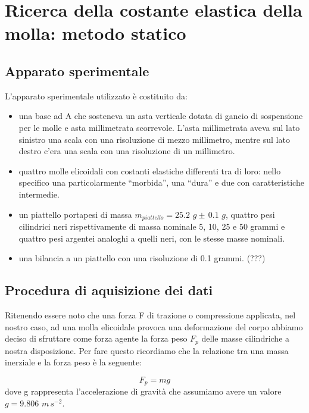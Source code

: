 \section{Ricerca della costante elastica della molla: metodo statico}

\subsection{Apparato sperimentale}
L'apparato sperimentale utilizzato è costituito da:
	\begin{itemize}
		\item{una base ad A che sosteneva un asta verticale dotata di gancio di sospensione per le molle e asta millimetrata scorrevole. L'asta millimetrata aveva sul lato sinistro una scala con una risoluzione di mezzo millimetro, mentre sul lato destro c'era una scala con una risoluzione di un millimetro.}
		\item{quattro molle elicoidali con costanti elastiche differenti tra di loro: nello specifico una particolarmente ``morbida'', una ``dura'' e due con caratteristiche intermedie.}
		\item{un piattello portapesi di massa $m_{piattello} = 25.2\,\,g \pm\, 0.1\,\,g$, quattro pesi cilindrici neri rispettivamente di massa nominale 5, 10, 25 e 50 grammi e quattro pesi argentei analoghi a quelli neri, con le stesse masse nominali.}
        \item{una bilancia a un piattello con una risoluzione di 0.1 grammi. (???)}
	\end{itemize}

\subsection{Procedura di aquisizione dei dati}

Ritenendo essere noto che una forza F di trazione o compressione applicata, nel nostro caso, ad una molla elicoidale provoca una deformazione del corpo abbiamo deciso di sfruttare come forza agente la forza peso $F_{p}$ delle masse cilindriche a nostra disposizione. Per fare questo ricordiamo che la relazione tra una massa inerziale e la forza peso è la seguente:

\begin{equation}
	F_{p} = mg
\end{equation}
%
dove g rappresenta l'accelerazione di gravità che assumiamo avere un valore $g = 9.806\,\,m\,s^{-2}$.

